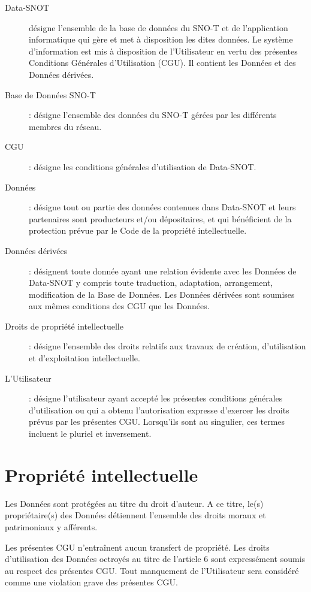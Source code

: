 \documentclass[]{article}
\begin{document}
\begin{description}
	\item[Data-SNOT] désigne l’ensemble de la base de données du SNO-T et de l'application informatique qui gère et met à disposition les dites données. Le système d’information est mis à disposition de l’Utilisateur en vertu des présentes Conditions Générales d’Utilisation (CGU). Il contient les Données et des Données dérivées. 
	
	\item[Base de Données SNO-T]: désigne l’ensemble des données du SNO-T gérées par les différents membres du réseau.
	
	\item[CGU]: désigne les conditions générales d’utilisation de Data-SNOT.
	
	\item[Données]: désigne tout ou partie des données contenues dans Data-SNOT et leurs partenaires sont producteurs et/ou dépositaires, et qui bénéficient de la protection prévue par le Code de la propriété intellectuelle. 
	
	\item[Données dérivées]: désignent toute donnée ayant une relation évidente avec les Données de Data-SNOT y compris toute traduction, adaptation, arrangement, modification de la Base de Données. Les Données dérivées sont soumises aux mêmes conditions des CGU que les Données. 
	
	\item[Droits de propriété intellectuelle]: désigne l’ensemble des droits relatifs aux travaux de création, d’utilisation et d’exploitation intellectuelle.
	 
	\item[L’Utilisateur]: désigne l’utilisateur ayant accepté les présentes conditions générales d’utilisation ou qui a obtenu l’autorisation expresse d’exercer les droits prévus par les présentes CGU. Lorsqu’ils sont au singulier, ces termes incluent le pluriel et inversement. 
\end{description}

\section{Propriété intellectuelle}

Les Données sont protégées au titre du droit d’auteur. A ce titre, le(s) propriétaire(s) des Données détiennent l’ensemble des droits moraux et patrimoniaux y afférents.

Les présentes CGU n’entraînent aucun transfert de propriété. Les droits d’utilisation des Données octroyés au titre de l’article 6 sont expressément soumis au respect des présentes CGU. Tout manquement de l’Utilisateur sera considéré comme une violation grave des présentes CGU.\\
\end{document}
